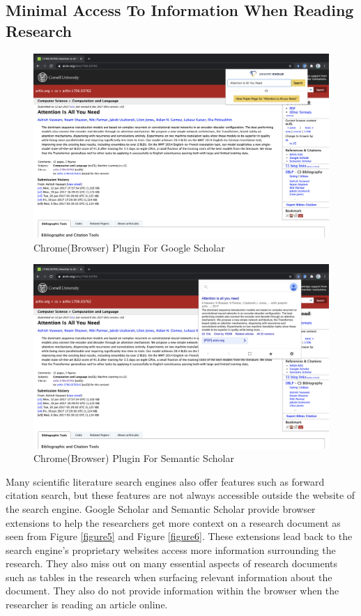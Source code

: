 \subsection{Minimal Access To Information When Reading Research}
\begin{figure}[h]
    \centering
    \includegraphics[width=\maxwidth{\textwidth}]{src/images/gg-plugin.png}
    \caption{Chrome(Browser) Plugin For Google Scholar}
    \label{figure\arabic{figurecounter}}
\end{figure}
\begin{figure}[h]
    \centering
    \includegraphics[width=\maxwidth{\textwidth}]{src/images/ss-plugin.png}
    \caption{Chrome(Browser) Plugin For Semantic Scholar}
    \label{figure\arabic{figurecounter}}
\end{figure}
Many scientific literature search engines also offer features such as forward citation search, but these features are not always accessible outside the website of the search engine. 
Google Scholar and Semantic Scholar provide browser extensions to help the researchers get more context on a research document as seen from Figure \ref{figure5} and Figure \ref{figure6}. 
These extensions lead back to the search engine's proprietary websites access more information surrounding the research. 
They also miss out on many essential aspects of research documents such as tables in the research when surfacing relevant information about the document. 
They also do not provide information within the browser when the researcher is reading an article online. 
\pagebreak
